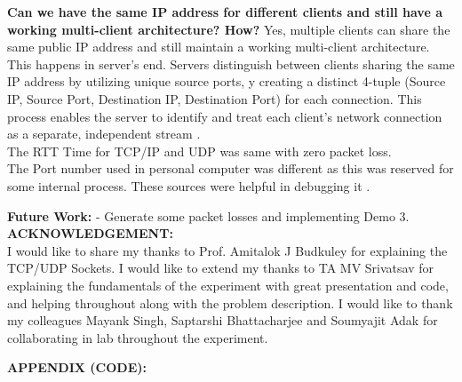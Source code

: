 \documentclass[a4paper,12pt]{article}
\begin{document}
\noindent
\textbf{Can we have the same IP address for different clients and still have a working multi-client architecture? How?}
\noindent
Yes, multiple clients can share the same public IP address and still maintain a working multi-client architecture. This happens in server's end. Servers distinguish between clients sharing the same IP address by utilizing unique source ports, y creating a distinct 4-tuple (Source IP, Source Port, Destination IP, Destination Port) for each connection. This process enables the server to identify and treat each client's network connection as a separate, independent stream \cite{agrawal_tcp_4tuple}.\\

\noindent
The RTT Time for TCP/IP and UDP was same with zero packet loss.\\
\noindent
The Port number used in personal computer was different as this was reserved for some internal process. These sources were helpful in debugging it \cite{stackoverflow,nishio_port5000}.

\noindent
\textbf{Future Work: } - Generate some packet losses and implementing Demo 3.\\

\noindent
\textbf{ACKNOWLEDGEMENT: }\\
I would like to share my thanks to Prof. Amitalok J Budkuley for explaining the TCP/UDP Sockets. I would like to extend my thanks to TA MV Srivatsav for explaining the
fundamentals of the experiment with great presentation and code,  and helping throughout along with the problem description. I
would like to thank my colleagues Mayank Singh, Saptarshi Bhattacharjee and Soumyajit Adak for collaborating in lab throughout the experiment.
\noindent
\printbibliography

\noindent
\textbf{APPENDIX (CODE): }\\
\appendix
\noindent
\end{document}
